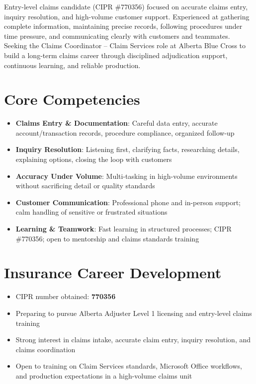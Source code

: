 \documentclass[11pt,a4paper,sans]{moderncv}
\begin{document}
\makecvtitle

\vspace{6pt}
\small{Entry-level claims candidate (CIPR \#770356) focused on accurate claims entry, inquiry resolution, and high-volume customer support. Experienced at gathering complete information, maintaining precise records, following procedures under time pressure, and communicating clearly with customers and teammates. Seeking the Claims Coordinator – Claim Services role at Alberta Blue Cross to build a long-term claims career through disciplined adjudication support, continuous learning, and reliable production.}

\section{Core Competencies}
\vspace{1pt}
\begin{itemize}
\item \textbf{Claims Entry \& Documentation}: Careful data entry, accurate account/transaction records, procedure compliance, organized follow-up
\item \textbf{Inquiry Resolution}: Listening first, clarifying facts, researching details, explaining options, closing the loop with customers
\item \textbf{Accuracy Under Volume}: Multi-tasking in high-volume environments without sacrificing detail or quality standards
\item \textbf{Customer Communication}: Professional phone and in-person support; calm handling of sensitive or frustrated situations
\item \textbf{Learning \& Teamwork}: Fast learning in structured processes; CIPR \#770356; open to mentorship and claims standards training
\end{itemize}

\section{Insurance Career Development}
\vspace{1pt}
\begin{itemize}
\item CIPR number obtained: \textbf{770356}
\item Preparing to pursue Alberta Adjuster Level 1 licensing and entry-level claims training
\item Strong interest in claims intake, accurate claim entry, inquiry resolution, and claims coordination
\item Open to training on Claim Services standards, Microsoft Office workflows, and production expectations in a high-volume claims unit
\end{itemize}
\end{document}
